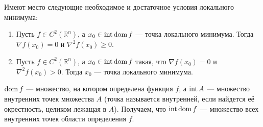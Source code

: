 \documentclass[a4paper, 12pt]{article}
\begin{document}
\begin{Theorem} Имеют место следующие необходимое и достаточное условия локального минимума:
\begin{enumerate}
    \item Пусть $f \in C^2(\mathbb{R}^n)$, а $x_0 \in \operatorname{\mathop{int}} \operatorname{\mathop{dom}} f$ --- точка локального минимума. Тогда $\nabla f(x_0) = 0$ и $\nabla^2 f(x_0) \geq 0$. 
    \item Пусть $f \in C^2(\mathbb{R}^n)$, а $x_0 \in \operatorname{\mathop{int}} \operatorname{\mathop{dom}} f$ такая, что $\nabla f(x_0) = 0$ и $\nabla^2 f(x_0) > 0$. Тогда $x_0$ --- точка локального минимума.
\end{enumerate}
\end{Theorem}
\begin{Comment}
    $\operatorname{\mathop{dom}} f$ --- множество, на котором определена функция $f$, а $\operatorname{\mathop{int}} A$ --- множество внутренних точек множества $A$ (точка называется внутренней, если найдется её окрестность, целиком лежащая в $A$). Получаем, что $\operatorname{\mathop{int}} \operatorname{\mathop{dom}} f$ --- множество всех внутренних точек области определения $f$.
\end{Comment}
\end{document}
